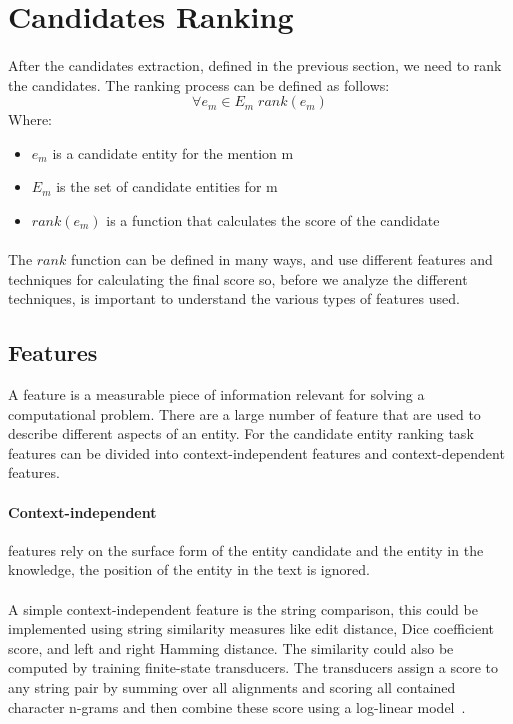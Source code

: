 \section{Candidates Ranking}
\paragraph{}
After the candidates extraction, defined in the previous section, we need to rank the candidates. The ranking process can be defined as follows:
\[\forall e_m \in E_m \; rank(e_m)\]
Where:

\begin{itemize}[noitemsep,  topsep=10pt]
\item $e_m$ is a candidate entity for the mention m
\item $E_m$ is the set of candidate entities for m
\item $rank(e_m)$ is a function that calculates the score of the candidate
\end{itemize}

\paragraph{}
The $rank$ function can be defined in many ways, and use different features and techniques for calculating the final score so, before we analyze the different techniques, is important to understand the various types of features used.
\pagebreak
\subsection{Features}
A feature is a measurable piece of information relevant for solving a computational problem. There are a large number of feature that are used to describe different aspects of an entity. For the candidate entity ranking task features can be divided into context-independent features and context-dependent features.

\paragraph{Context-independent} features rely on the surface form of the entity candidate and the entity in the knowledge, the position of the entity in the text is ignored. 

\paragraph{} A simple context-independent feature is the string comparison, this could be implemented using string similarity measures like edit distance, Dice coefficient score, and left and right Hamming distance. The similarity could also be computed by training finite-state transducers. The transducers assign a score to any string pair by summing over all alignments and scoring all contained character n-grams and then combine these score using a log-linear model~\cite{dredze2010entity}.

